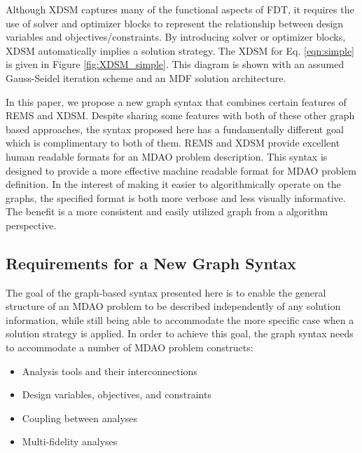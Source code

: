     Although XDSM captures many of the functional aspects of FDT, it 
    requires the use of solver and optimizer blocks to represent 
    the relationship between design variables and objectives/constraints. 
    By introducing solver or optimizer blocks, XDSM automatically implies a solution strategy. 
    The XDSM for Eq. \ref{eqn:simple} is given in Figure \ref{fig:XDSM_simple}. 
    This diagram is shown with an assumed Gauss-Seidel iteration scheme and an MDF solution architecture. 

    In this paper, we propose a new graph syntax that combines certain features of REMS and XDSM. 
    Despite sharing some features with both of these other graph based approaches, the syntax
    proposed here has a fundamentally different goal which is complimentary to both of them. 
    REMS and XDSM provide excellent human readable formats for an MDAO problem description. This 
    syntax is designed to provide a more effective machine readable format for MDAO problem definition. 
    In the interest of making it easier to algorithmically operate on the graphs, the specified 
    format is both more verbose and less visually informative. The benefit is a more consistent 
    and easily utilized graph from a algorithm perspective. 

\subsection{Requirements for a New Graph Syntax}
  \label{s:requirements}
  The goal of the graph-based syntax presented here is to enable the general 
  structure of an MDAO problem to be described independently of any solution information, 
  while still being able to accommodate the more specific case when a solution 
  strategy is applied. In order to achieve this goal, 
  the graph syntax needs to accommodate a number of MDAO problem constructs: 
  \begin{itemize}
    \item Analysis tools and their interconnections
    \item Design variables, objectives, and constraints
    \item Coupling between analyses
    \item Multi-fidelity analyses
  \end{itemize}

